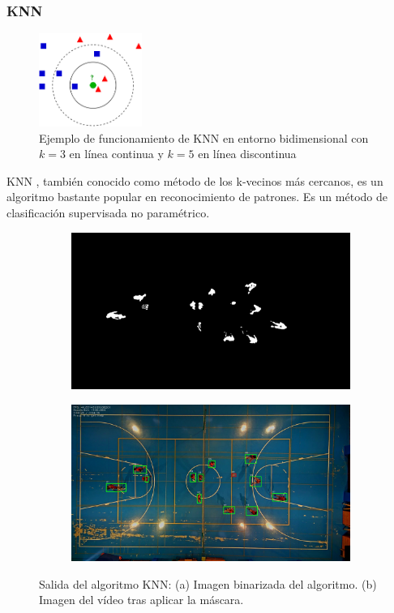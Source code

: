 \subsubsection*{KNN}
\begin{figure}[H]
    \centering
    \includegraphics[width=0.3\textwidth]{images/knnejemplo}
    \caption{Ejemplo de funcionamiento de KNN en entorno bidimensional con $k=3$ en línea continua y $k=5$ en línea discontinua}
    \label{fig:knnejemplo}
\end{figure}

KNN \cite{Bishop:2006:PRM:1162264}, también conocido como método de los k-vecinos más cercanos, es un algoritmo bastante popular en reconocimiento de patrones. Es un método de clasificación supervisada no paramétrico.

\begin{figure}
\begin{subfigure}{.5\textwidth}
  \centering
  \includegraphics[width=.9\linewidth]{images/KNNsub}
  \caption { }
  \label{fig:KNN1a}
\end{subfigure}%
\begin{subfigure}{.5\textwidth}
  \centering
  \includegraphics[width=.9\linewidth]{images/KNN}
  \caption { }
  \label{fig:KNN1b}
\end{subfigure}
\caption{Salida del algoritmo KNN: (a) Imagen binarizada del algoritmo. (b) Imagen del vídeo tras aplicar la máscara.}
\label{fig:KNN}
\end{figure}

